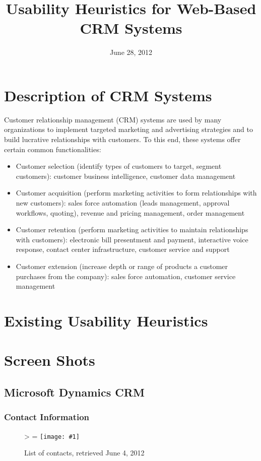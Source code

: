 \documentclass[11pt,letterpaper]{article}
\newlength{\imgwidth}
\newlength{\imgheight}
\newlength{\finalwidth}
\newlength{\finalheight}
\newlength{\imgtextheight}
\newcommand{\scalegraphics}[1]{%
	\settowidth{\imgwidth}{\texttt{[image: \#1]}}%
	\settoheight{\imgheight}{\texttt{[image: \#1]}}%
	\ifnum\imgwidth>\imgheight \def\imgangle{90} \else \def\imgangle{0} \fi%
	\setlength{\imgtextheight}{0.74\textheight}%
	\setlength{\finalwidth}{\minof{\imgwidth}{\textwidth}}%
	\setlength{\finalheight}{\minof{\imgheight}{\imgtextheight}}%
	\ifnum\finalwidth=\imgwidth \def\imgangle{0} \fi%
	\texttt{[image: \#1]}%
}
\begin{document}
\title{Usability Heuristics for Web-Based CRM Systems}
\date{June 28, 2012}
\maketitle

\section{Description of CRM Systems}
Customer relationship management (CRM) systems are used by many organizations to implement targeted marketing and advertising strategies and to build lucrative relationships with customers. To this end, these systems offer certain common functionalities:

\begin{itemize}
	\item Customer selection (identify types of customers to target, segment customers): customer business intelligence, customer data management
	\item Customer acquisition (perform marketing activities to form relationships with new customers): sales force automation (leads management, approval workflows, quoting), revenue and pricing management, order management
	\item Customer retention (perform marketing activities to maintain relationships with customers): electronic bill presentment and payment, interactive voice response, contact center infrastructure, customer service and support
	\item Customer extension (increase depth or range of products a customer purchases from the company): sales force automation, customer service management
\end{itemize}

\section{Existing Usability Heuristics}


\newpage
\section{Screen Shots}

\subsection{Microsoft Dynamics CRM}

\FloatBarrier
\subsubsection{Contact Information}
\begin{figure}[htbp]
	\centering
	\scalegraphics{./img/dynamics/msft_contact_list}
	\caption[Microsoft Dynamics CRM: List of contacts]{List of contacts, retrieved June 4, 2012}
\end{figure}
\end{document}

